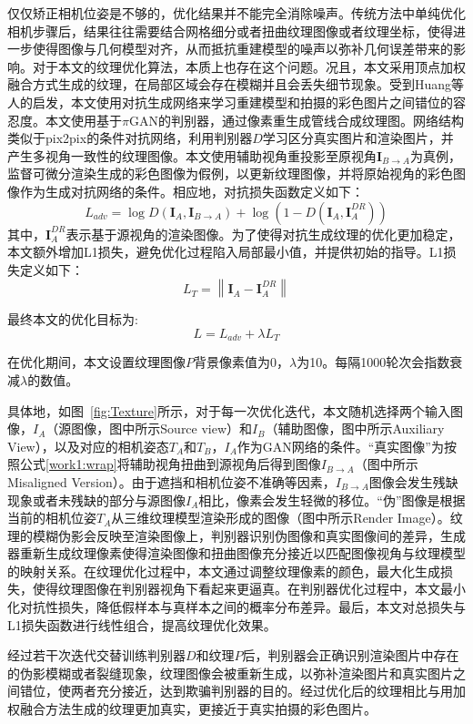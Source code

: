 仅仅矫正相机位姿是不够的，优化结果并不能完全消除噪声。传统方法中单纯优化相机步骤后，结果往往需要结合网格细分或者扭曲纹理图像或者纹理坐标，使得进一步使得图像与几何模型对齐，从而抵抗重建模型的噪声以弥补几何误差带来的影响。对于本文的纹理优化算法，本质上也存在这个问题。况且，本文采用顶点加权融合方式生成的纹理，在局部区域会存在模糊并且会丢失细节现象。受到Huang等人的启发，本文使用对抗生成网络来学习重建模型和拍摄的彩色图片之间错位的容忍度。本文使用基于$\pi$GAN的判别器，通过像素重生成管线合成纹理图。网络结构类似于pix2pix的条件对抗网络，利用判别器$D$学习区分真实图片和渲染图片，并产生多视角一致性的纹理图像。本文使用辅助视角重投影至原视角$\boldsymbol{I}_{B \rightarrow A}$为真例，监督可微分渲染生成的彩色图像为假例，以更新纹理图像，并将原始视角的彩色图像作为生成对抗网络的条件。相应地，对抗损失函数定义如下：
\begin{equation}
	L_{a d v}=\log D\left(\boldsymbol{I}_{A}, \boldsymbol{I}_{B \rightarrow A}\right)+\log \left(1-D\left(\boldsymbol{I}_{A},\boldsymbol{I}_{A}^{D R}\right)\right) 
\end{equation}
其中，$\boldsymbol{I}_{A}^{DR}$表示基于源视角的渲染图像。为了使得对抗生成纹理的优化更加稳定，本文额外增加L1损失，避免优化过程陷入局部最小值，并提供初始的指导。L1损失定义如下：
\begin{equation}
L_T = \left \| \boldsymbol{I}_{A}- \boldsymbol{I}_{A}^{D R} \right \| 
\end{equation} \par
 最终本文的优化目标为:
\begin{equation}
	L = L_{adv} + \lambda L_T \label{texture}
\end{equation}

在优化期间，本文设置纹理图像$P$背景像素值为0，$\lambda$为10。每隔1000轮次会指数衰减$\lambda$的数值。\par
具体地，如图~\ref{fig:Texture}所示，对于每一次优化迭代，本文随机选择两个输入图像，$I_A$（源图像，图中所示Source view）和$I_B$（辅助图像，图中所示Auxiliary View），以及对应的相机姿态$T_A$和$T_B$，$I_A$作为GAN网络的条件。“真实图像”为按照公式\ref{work1:wrap}将辅助视角扭曲到源视角后得到图像$I_{B\to A}$（图中所示Misaligned Version）。由于遮挡和相机位姿不准确等因素，$I_{B\to A}$图像会发生残缺现象或者未残缺的部分与源图像$I_A$相比，像素会发生轻微的移位。“伪”图像是根据当前的相机位姿$T_A$从三维纹理模型渲染形成的图像（图中所示Render Image）。纹理的模糊伪影会反映至渲染图像上，判别器识别伪图像和真实图像间的差异，生成器重新生成纹理像素使得渲染图像和扭曲图像充分接近以匹配图像视角与纹理模型的映射关系。在纹理优化过程中，本文通过调整纹理像素的颜色，最大化生成损失，使得纹理图像在判别器视角下看起来更逼真。在判别器优化过程中，本文最小化对抗性损失，降低假样本与真样本之间的概率分布差异。最后，本文对总损失与L1损失函数进行线性组合，提高纹理优化效果。\par
经过若干次迭代交替训练判别器$D$和纹理$P$后，判别器会正确识别渲染图片中存在的伪影模糊或者裂缝现象，纹理图像会被重新生成，以弥补渲染图片和真实图片之间错位，使两者充分接近，达到欺骗判别器的目的。经过优化后的纹理相比与用加权融合方法生成的纹理更加真实，更接近于真实拍摄的彩色图片。\par


